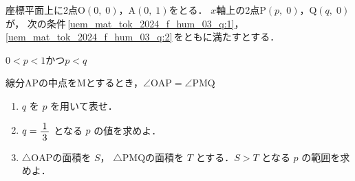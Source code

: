 ﻿\documentclass[../../../uem_mat_tok_q.tex]{subfiles}
\begin{document}
    座標平面上に2点$\mathrm{O}(0,\;0)$，$\mathrm{A}(0,\;1)$をとる．%
    $x$軸上の2点$\mathrm{P}(p,\;0)$，$\mathrm{Q}(q,\;0)$が，%
    次の条件\,\ref{uem_mat_tok_2024_f_hum_03_q:1}，\ref{uem_mat_tok_2024_f_hum_03_q:2}\,をともに満たすとする．
    
    \begin{myenua}
            \item $0<p<1$\;\;かつ\;\;$p<q$ \label{uem_mat_tok_2024_f_hum_03_q:1}
            \item 線分APの中点をMとするとき，$\angle\mathrm{OAP}=\angle\mathrm{PMQ}$%
                \label{uem_mat_tok_2024_f_hum_03_q:2}
    \end{myenua}
    \begin{enumerate}
        \item $q$ を $p$ を用いて表せ．
        \item $q=\myfraca{1}{3}$ となる $p$ の値を求めよ．
        \item $\triangle\mathrm{OAP}$の面積を $S$，%
            $\triangle\mathrm{PMQ}$の面積を $T$ とする．$S>T$ となる $p$ の範囲を求めよ．
    \end{enumerate}
\end{document}
